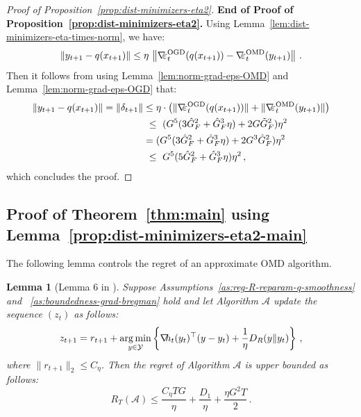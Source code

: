 \documentclass[a4paper,11pt,fullpage]{article}
\def\Y{{\mathcal Y}}
\newcommand{\A}{\mathcal{A}}
\theoremstyle{plain}
\newtheorem{lemma}{Lemma}
\theoremstyle{definition}
\theoremstyle{plain}
\DeclareMathOperator*{\argmin}{arg\,min}
\renewcommand{\leq}{~\le~}
\let\nablaold\nabla
\renewcommand{\nabla}{\nablaold\mkern-2.5mu}
\begin{document}
\begin{proof}[Proof of Proposition~\ref{prop:dist-minimizers-eta2}]
\noindent\textbf{End of Proof of Proposition~\ref{prop:dist-minimizers-eta2}.} 
Using Lemma~\ref{lem:dist-minimizers-eta-times-norm}, we have: 
\begin{equation*}
\|y_{t+1} - q(x_{t+1})\| \le \eta\,
\left\|\nabla\varepsilon_t^{\mathrm{OGD}}(q(x_{t+1})) - \nabla\varepsilon_t^{\mathrm{OMD}}(y_{t+1})\right\|\,.
\end{equation*}
Then it follows from using Lemma~\ref{lem:norm-grad-eps-OMD} and Lemma~\ref{lem:norm-grad-eps-OGD} that: 
\begin{align}
\|y_{t+1}-q(x_{t+1})\| = 
\|\delta_{t+1}\|
&\le
\eta\cdot
\left(
\|\nabla\varepsilon_t^{\mathrm{OGD}}(q(x_{t+1}))\|
+
\|\nabla\varepsilon_t^{\mathrm{OMD}}(y_{t+1})\|
\right)\nonumber\\
&\leq (G^5 (3\hat{G}_F^2 + \hat{G}_F^3 \eta) + 2 G \tilde{G}_F^2) \eta^2 \nonumber\\
&= (G^5 (3\hat{G}_F^2 + \hat{G}_F^3 \eta) + 2 G^3 \hat{G}_F^2)\eta^2\nonumber\\
&\leq G^5 (5\hat{G}_F^2 + \hat{G}_F^3 \eta) \eta^2\,,
\end{align}
which concludes the proof. 
\end{proof}

\subsection{Proof of Theorem~\ref{thm:main} using Lemma~\ref{prop:dist-minimizers-eta2-main}}

The following lemma controls the regret of an approximate OMD algorithm. 
\begin{lemma}[Lemma 6 in \citet{ghai-lu-hazan22}]
\label{lem2} 
Suppose Assumptions~\ref{as:reg-R-reparam-q-smoothness} and ~\ref{as:boundedness-grad-bregman} hold and let Algorithm $\A$ update the sequence $(z_t)$ as follows:
$$
    z_{t+1}=r_{t+1} +\argmin_{y\in \Y} \left\{ \nabla h_t(y_t)^{\top}(y-y_t) +\frac{1}{\eta} D_R(y\|y_t) \right\}\,, 
$$
where $\|r_{t+1}\|_2 \le C_{\eta}$. Then the regret of Algorithm $\A$ is upper bounded as follows: 
$$
R_T(\A) \le \frac{C_{\eta} T G}{\eta} + \frac{D_1}{\eta} +\frac{\eta G^2 T}{2}\,.
$$
\end{lemma}
\end{document}
